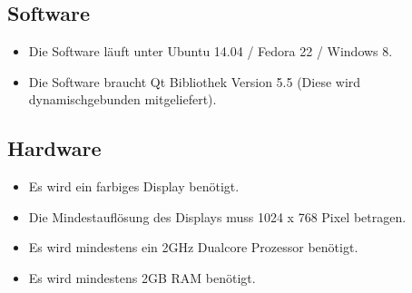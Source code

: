 \subsection{Software}
\begin{itemize}
\item Die Software läuft unter Ubuntu 14.04 / Fedora 22 / Windows 8. 
\item Die Software braucht Qt Bibliothek Version 5.5 (Diese wird dynamischgebunden mitgeliefert).
\end{itemize}
\subsection{Hardware}
\begin{itemize}
\item Es wird ein farbiges Display benötigt. 
\item Die Mindestauflösung des Displays muss 1024 x 768 Pixel betragen.
\item Es wird mindestens ein 2GHz Dualcore Prozessor benötigt.
\item Es wird mindestens 2GB RAM benötigt.
\end{itemize}
